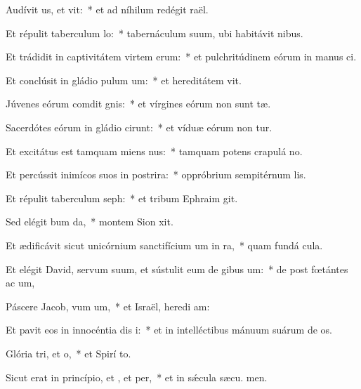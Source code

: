 \item Audívit us, et vit:~* et ad níhilum redégit  raël.
\item Et répulit taberculum lo:~* tabernáculum suum, ubi habitávit  nibus.
\item Et trádidit in captivitátem virtem erum:~* et pulchritúdinem eórum in manus ci.
\item Et conclúsit in gládio pulum um:~* et hereditátem  vit.
\item Júvenes eórum comdit gnis:~* et vírgines eórum non sunt tæ.
\item Sacerdótes eórum in gládio cirunt:~* et víduæ eórum non tur.
\item Et excitátus est tamquam miens nus:~* tamquam potens crapulá  no.
\item Et percússit inimícos suos in postrira:~* oppróbrium sempitérnum  lis.
\item Et répulit taberculum seph:~* et tribum Ephraim  git.
\item Sed elégit bum da,~* montem Sion  xit.
\item Et ædificávit sicut unicórnium sanctifícium um in ra,~* quam fundá  cula.
\item Et elégit David, servum suum, et sústulit eum de gibus um:~* de post fœtántes ac um,
\item Páscere Jacob, vum um,~* et Israël, heredi am:
\item Et pavit eos in innocéntia dis i:~* et in intelléctibus mánuum suárum de os.
\item Glória tri, et o,~* et Spirí to.
\item Sicut erat in princípio, et , et per,~* et in sǽcula sæcu. men.
